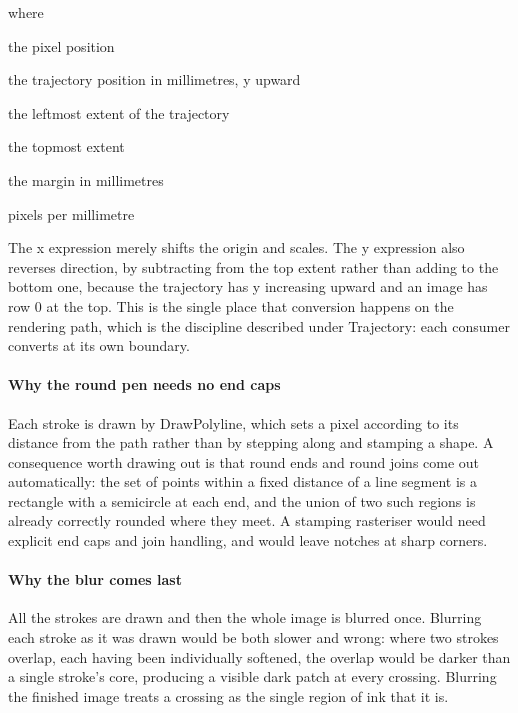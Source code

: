 \noindent where
\begin{description}[leftmargin=2.4em,style=nextline,font=\normalfont\ttfamily]\setlength\itemsep{1pt}
  \item[{$x_{\mathrm{px}},\, y_{\mathrm{px}}$}] \normalfont the pixel position
  \item[{$x,\,y$}] \normalfont the trajectory position in millimetres, y upward
  \item[{$x_0$}] \normalfont the leftmost extent of the trajectory
  \item[{$y_1$}] \normalfont the topmost extent
  \item[{$\mathrm{pad}$}] \normalfont the margin in millimetres
  \item[{$\mathrm{ppm}$}] \normalfont pixels per millimetre
\end{description}
The x expression merely shifts the origin and scales. The y expression also reverses direction, by subtracting from the top extent rather than adding to the bottom one, because the trajectory has y increasing upward and an image has row 0 at the top. This is the single place that conversion happens on the rendering path, which is the discipline described under Trajectory: each consumer converts at its own boundary.


\paragraph{Why the round pen needs no end caps}
Each stroke is drawn by DrawPolyline, which sets a pixel according to its distance from the path rather than by stepping along and stamping a shape. A consequence worth drawing out is that round ends and round joins come out automatically: the set of points within a fixed distance of a line segment is a rectangle with a semicircle at each end, and the union of two such regions is already correctly rounded where they meet. A stamping rasteriser would need explicit end caps and join handling, and would leave notches at sharp corners.


\paragraph{Why the blur comes last}
All the strokes are drawn and then the whole image is blurred once. Blurring each stroke as it was drawn would be both slower and wrong: where two strokes overlap, each having been individually softened, the overlap would be darker than a single stroke's core, producing a visible dark patch at every crossing. Blurring the finished image treats a crossing as the single region of ink that it is.



